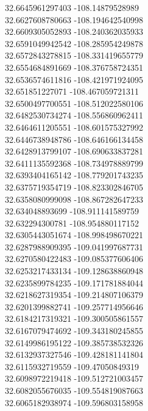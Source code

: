 {32.6645961297403	-108.14879528989\\
32.6627608780663	-108.194642540998\\
32.6609305052893	-108.240362035933\\
32.6591049942542	-108.285954249878\\
32.6572843278815	-108.331419655779\\
32.6554684891669	-108.376758724351\\
32.6536574611816	-108.421971924095\\
32.651851227071	-108.467059721311\\
32.6500497700551	-108.512022580106\\
32.6482530734274	-108.556860962411\\
32.6464611205551	-108.601575327992\\
32.6446738948786	-108.646166134458\\
32.6428913799107	-108.690633837281\\
32.6411135592368	-108.734978889799\\
32.6393404165142	-108.779201743235\\
32.6375719354719	-108.823302846705\\
32.6358080999098	-108.867282647233\\
32.634048893699	-108.911141589759\\
32.632294300781	-108.954880117152\\
32.6305443051674	-108.998498670221\\
32.6287988909395	-109.041997687731\\
32.6270580422483	-109.085377606406\\
32.6253217433134	-109.128638860948\\
32.6235899784235	-109.171781884044\\
32.6218627319354	-109.214807106379\\
32.6201399882741	-109.257714956646\\
32.6184217319321	-109.300505861557\\
32.6167079474692	-109.343180245855\\
32.6149986195122	-109.385738532326\\
32.6132937327546	-109.428181141804\\
32.6115932719559	-109.47050849319\\
32.6098972219418	-109.512721003457\\
32.6082055676035	-109.554819087663\\
32.6065182938974	-109.596803158958\\
}
